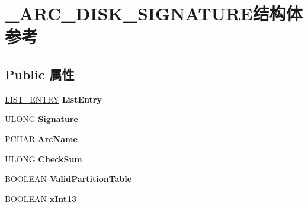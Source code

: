 \hypertarget{struct___a_r_c___d_i_s_k___s_i_g_n_a_t_u_r_e}{}\section{\+\_\+\+A\+R\+C\+\_\+\+D\+I\+S\+K\+\_\+\+S\+I\+G\+N\+A\+T\+U\+R\+E结构体 参考}
\label{struct___a_r_c___d_i_s_k___s_i_g_n_a_t_u_r_e}
\subsection*{Public 属性}
\begin{DoxyCompactItemize}
\item 
\mbox{\label{struct___a_r_c___d_i_s_k___s_i_g_n_a_t_u_r_e_a65cbb26d79e9e9d7c8fb6e915c16e372}} 
\hyperlink{struct___l_i_s_t___e_n_t_r_y}{L\+I\+S\+T\+\_\+\+E\+N\+T\+RY} {\bfseries List\+Entry}
\item 
\mbox{\label{struct___a_r_c___d_i_s_k___s_i_g_n_a_t_u_r_e_af3ae83ebab83176d394ba7d5aa18988a}} 
U\+L\+O\+NG {\bfseries Signature}
\item 
\mbox{\label{struct___a_r_c___d_i_s_k___s_i_g_n_a_t_u_r_e_aec8a1e91a4559c1caadfdba62f6d2e82}} 
P\+C\+H\+AR {\bfseries Arc\+Name}
\item 
\mbox{\label{struct___a_r_c___d_i_s_k___s_i_g_n_a_t_u_r_e_a51fa44e7f4df4b6a789070d5e161d6da}} 
U\+L\+O\+NG {\bfseries Check\+Sum}
\item 
\mbox{\label{struct___a_r_c___d_i_s_k___s_i_g_n_a_t_u_r_e_af2a22ceef320031a0c32daf6660ec050}} 
\hyperlink{_processor_bind_8h_a112e3146cb38b6ee95e64d85842e380a}{B\+O\+O\+L\+E\+AN} {\bfseries Valid\+Partition\+Table}
\item 
\mbox{\label{struct___a_r_c___d_i_s_k___s_i_g_n_a_t_u_r_e_adca830c759698f9a5883a536f422190f}} 
\hyperlink{_processor_bind_8h_a112e3146cb38b6ee95e64d85842e380a}{B\+O\+O\+L\+E\+AN} {\bfseries x\+Int13}
\item 

\end{DoxyCompactItemize}
